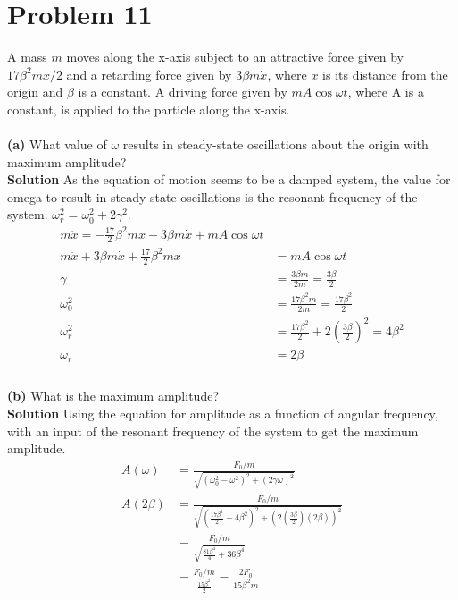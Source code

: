 \documentclass[]{article}
\newcommand{\bd}{\textbf}
\begin{document}
	\section{Problem 11}
	
	A mass $ m $ moves along the x-axis subject to an attractive force given by $ 17 \beta^2 m x / 2 $ and a retarding force given by $ 3 \beta m \dot{x} $, where $ x $ is its distance from the origin and $\beta$ is a constant. A driving force given by $ m A \cos \omega t $, where A is a constant, is applied to the particle along the x-axis.
	\\\\
	\bd{(a)} What value of $ \omega $ results in steady-state oscillations about the origin with maximum amplitude? \\
	
	\bd{Solution} As the equation of motion seems to be a damped system, the value for omega to result in steady-state oscillations is the resonant frequency of the system. $ \omega_r^2 = \omega_0^2 + 2\gamma^2 $.
	\begin{equation}
		\begin{split}
			m\ddot{x} = -\frac{17}{2}\beta^2 mx - 3\beta m\dot{x} + mA\cos{\omega t} \\
			m\ddot{x} + 3\beta m\dot{x} + \frac{17}{2}\beta^2 mx &= mA\cos{\omega t} \\
			\gamma &= \frac{3\beta m}{2m} = \frac{3\beta}{2} \\
			\omega_0^2 &= \frac{17\beta^2 m}{2m} = \frac{17\beta^2}{2} \\
			\omega_r^2 &= \frac{17\beta^2}{2} + 2\left( \frac{3\beta}{2} \right)^2 = 4\beta^2 \\
			\omega_r &= 2\beta \\
		\end{split}
	\end{equation}
	\\
	\bd{(b)} What is the maximum amplitude? \\

	\bd{Solution} Using the equation for amplitude as a function of angular frequency, with an input of the resonant frequency of the system to get the maximum amplitude.
	\begin{equation}
		\begin{split}
			A(\omega) &= \frac{F_0 / m}{\sqrt{ \left( \omega_0^2 - \omega^2 \right)^2 + \left( 2\gamma \omega \right)^2 }} \\
			A(2\beta) &= \frac{F_0 / m}{\sqrt{ \left( \frac{17\beta^2}{2} - 4\beta^2 \right)^2 + \left( 2 \left( \frac{3\beta}{2} \right) \left( 2\beta \right) \right)^2 }} \\
			&= \frac{F_0 / m}{\sqrt{ \frac{81\beta^4}{4} + 36\beta^4 }} \\
			&= \frac{F_0 / m}{\frac{15\beta^2}{2}} = \frac{2F_0}{15\beta^2 m} \\
		\end{split}
	\end{equation}
\end{document}
